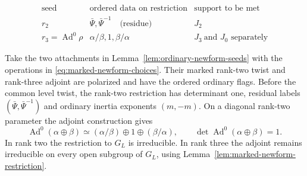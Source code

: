 \begin{construction}
\[
\begin{array}{lll}
\text{seed}&\text{ordered data on restriction}&\text{support to be met}\\ \hline
r_2&\bar\Psi,\bar\Psi^{-1}\quad\text{(residue)}&J_2\\
r_3=\operatorname{Ad}^0\rho&\alpha/\beta,1,\beta/\alpha&
        J_3\ \text{and }J_0\text{ separately}
\end{array}
\]
\caption{The two seeds before the common level twist. The adjoint column uses a diagonal rank-two parameter with characters \(\alpha,\beta\).}\label{fig:ordinary-seed-ranks}
\end{construction}

\begin{proposition}
\label{prop:marked-rank-two-three-seeds}
Take the two attachments in Lemma~\ref{lem:ordinary-newform-seeds}
with the operations in \eqref{eq:marked-newform-choices}. Their marked
rank-two twist and rank-three adjoint are polarized and have the
ordered ordinary flags. Before the common level twist, the rank-two
restriction has determinant one, residual labels
\((\bar\Psi,\bar\Psi^{-1})\) and ordinary inertia exponents
\((m,-m)\). On a diagonal rank-two parameter the adjoint construction gives
\[
 \operatorname{Ad}^0(\alpha\oplus\beta)
      \simeq(\alpha/\beta)\oplus1\oplus(\beta/\alpha),\qquad
 \det\operatorname{Ad}^0(\alpha\oplus\beta)=1 .
\] In rank two the restriction to
\(G_L\) is irreducible. In rank three the adjoint remains irreducible
on every open subgroup of \(G_L\), using
Lemma~\ref{lem:marked-newform-restriction}.
\end{proposition}

